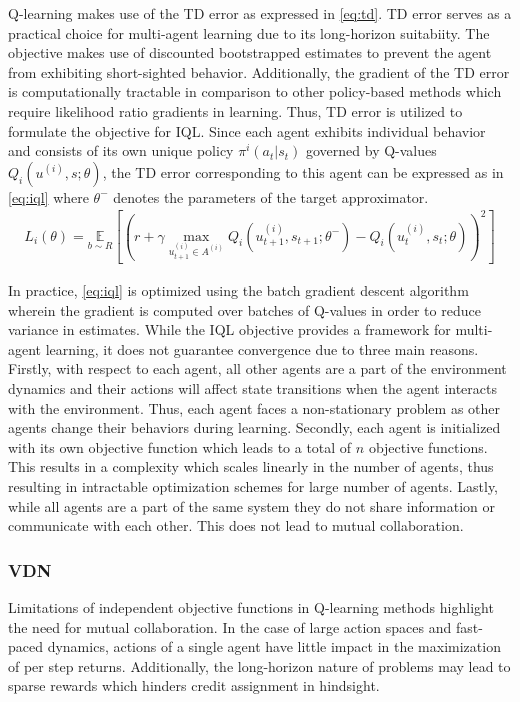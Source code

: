 \documentclass{article}
\begin{document}
\begin{multicols}{2}
Q-learning makes use of the TD error as expressed in \autoref{eq:td}. TD error serves as a practical choice for multi-agent learning due to its long-horizon suitabiity. The objective makes use of discounted bootstrapped estimates to prevent the agent from exhibiting short-sighted behavior. Additionally, the gradient of the TD error is computationally tractable in comparison to other policy-based methods \cite{rl} which require likelihood ratio gradients in learning. Thus, TD error is utilized to formulate the objective for IQL. Since each agent exhibits individual behavior and consists of its own unique policy $\pi^{i}(a_{t}|s_{t})$ governed by Q-values $Q_{i}(u^{(i)},s;\theta)$, the TD error corresponding to this agent can be expressed as in \autoref{eq:iql} where $\theta^{-}$ denotes the parameters of the target approximator. 
\begin{gather}
  L_{i}(\theta) = \underset{b \sim R}{\mathbb{E}}[(r + \gamma \underset{u^{(i)}_{t+1}\in A^{(i)}}{\max} Q_{i}(u^{(i)}_{t+1},s_{t+1};\theta^{-}) - Q_{i}(u_{t}^{(i)},s_{t};\theta))^{2}] \label{eq:iql}
\end{gather}

In practice, \autoref{eq:iql} is optimized using the batch gradient descent algorithm wherein the gradient is computed over batches of Q-values in order to reduce variance in estimates. While the IQL objective provides a framework for multi-agent learning, it does not guarantee convergence due to three main reasons. Firstly, with respect to each agent, all other agents are a part of the environment dynamics and their actions will affect state transitions when the agent interacts with the environment. Thus, each agent faces a non-stationary problem as other agents change their behaviors during learning. Secondly, each agent is initialized with its own objective function which leads to a total of $n$ objective functions. This results in a complexity which scales linearly in the number of agents, thus resulting in intractable optimization schemes for large number of agents. Lastly, while all agents are a part of the same system they do not share information or communicate with each other. This does not lead to mutual collaboration. 

\subsubsection{VDN}
Limitations of independent objective functions in Q-learning methods highlight the need for mutual collaboration. In the case of large action spaces \cite{hdqn} and fast-paced dynamics, actions of a single agent have little impact in the maximization of per step returns. Additionally, the long-horizon nature \cite{hdqn} of problems may lead to sparse rewards which hinders credit assignment in hindsight. 


\end{multicols}
\end{document}
